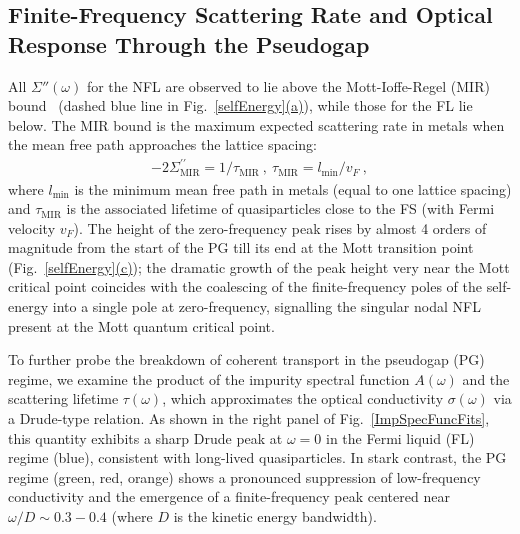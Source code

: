 \subsection{Finite-Frequency Scattering Rate and Optical Response Through the Pseudogap}
All $\Sigma''(\omega)$ for the NFL are observed to lie above the Mott-Ioffe-Regel (MIR) bound~\cite{GunnarssonRMP2003,Hussey2004} (dashed blue line in Fig.~\hyperref[selfEnergy]{\ref*{selfEnergy}(a)}), while those for the FL lie below. The MIR bound is the maximum expected scattering rate in metals when the mean free path approaches the lattice spacing: 
\begin{equation}
\begin{aligned}
-2\Sigma^{\prime\prime}_\text{MIR} = 1/\tau_\text{MIR}~, ~\tau_\text{MIR} = l_\text{min}/v_{F}~,
\end{aligned}
\end{equation}
where $l_\text{min}$ is the minimum mean free path in metals (equal to one lattice spacing) and $\tau_\text{MIR}$ is the associated lifetime of quasiparticles close to the FS (with Fermi velocity $v_F$). 
The height of the zero-frequency peak rises by almost 4 orders of magnitude from the start of the PG till its end at the Mott transition point (Fig.~\hyperref[selfEnergy]{\ref*{selfEnergy}(c)}); the dramatic growth of the peak height very near the Mott critical point coincides with the coalescing of the finite-frequency poles of the self-energy into a single pole at zero-frequency, signalling the singular nodal NFL present at the Mott quantum critical point.

To further probe the breakdown of coherent transport in the pseudogap (PG) regime, we examine the product of the impurity spectral function $A(\omega)$ and the scattering lifetime $\tau(\omega)$, which approximates the optical conductivity $\sigma(\omega)$ via a Drude-type relation. As shown in the right panel of Fig.~\ref{ImpSpecFuncFits}, this quantity exhibits a sharp Drude peak at $\omega = 0$ in the Fermi liquid (FL) regime (blue), consistent with long-lived quasiparticles. In stark contrast, the PG regime (green, red, orange) shows a pronounced suppression of low-frequency conductivity and the emergence of a finite-frequency peak centered near $\omega/D \sim 0.3{-}0.4$ (where $D$ is the kinetic energy bandwidth).



